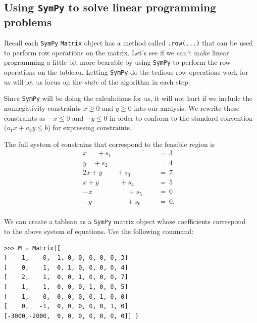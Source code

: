 \documentclass[11pt,oneside]{article}
\begin{document}
\subsection{Using \texttt{SymPy} to solve linear programming problems}

	Recall each \texttt{SymPy} \texttt{Matrix} object has a method called \texttt{.row(...)} that
	can be used to perform row operations on the matrix.
	Let's see if we can't make linear programming a little bit more bearable by using \texttt{SymPy}
	to perform the row operations on the tableau.
	Letting \texttt{SymPy} do the tedious row operations work for us will 
	let us focus on the \emph{state} of the algorithm in each step.
	
	Since \texttt{SymPy} will be doing the calculations for us,
	it will not hurt if we include the nonnegativity constraints $x\geq0$ and $y\geq 0$ into our analysis.
	We rewrite these constraints as $-x \leq 0$ and $-y \leq 0$ in order to conform to the standard convention ($a_1x+a_2y \leq b$) 
	for expressing constraints.

	The full system of constrains that correspond to the feasible region is
	\[
		\begin{array}{rl}
				x \ \ \quad	+s_1 \quad \quad \quad \quad \quad		\ &=	\ 3	\\
					y       \quad +s_2 \quad \quad \quad \quad 		\ &= 	\ 4	\\
				2x	+ y	 \quad \quad + s_3 \quad \quad \quad		\ &= 	\ 7	\\
				x 	+ y	 \quad \quad \quad + s_4 \quad \quad 		\ &= 	\ 5	\\
				-x \ \ \	 	\quad \ \ \quad \quad \quad +s_5 \quad 		\ &=	\ 0	\\
					-y       \quad \quad \quad \quad \quad + s_6   		\ &= 	\ 0.	\\
		\end{array} 		
	\]
	
	\noindent
	We can create a tableau as a \texttt{SymPy} matrix object whose coefficients 
	correspond to the above system of equations. Use the following command:
\begin{verbatim}
>>> M = Matrix([
[    1,    0,  1, 0, 0, 0, 0, 0, 3]
[    0,    1,  0, 1, 0, 0, 0, 0, 4]
[    2,    1,  0, 0, 1, 0, 0, 0, 7]
[    1,    1,  0, 0, 0, 1, 0, 0, 5]
[   -1,    0,  0, 0, 0, 0, 1, 0, 0]
[    0,   -1,  0, 0, 0, 0, 0, 1, 0]
[-3000,-2000,  0, 0, 0, 0, 0, 0, 0]] )
\end{verbatim}
\end{document}
